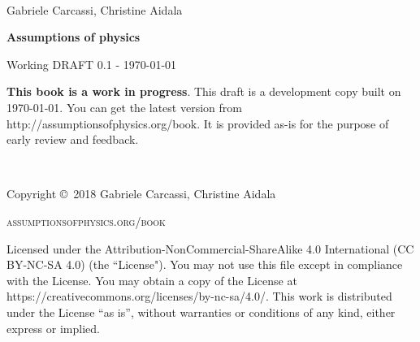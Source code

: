 \documentclass[11pt,letterpaper,fleqn]{memoir} %
\begin{document}
	




\frontmatter
\thispagestyle{empty}

~

\vspace{20pt}

{\large \noindent Gabriele Carcassi, Christine Aidala }

\vspace{60pt}

{\Huge \noindent \textbf{Assumptions of physics}}

\vspace{30pt}

{\large \noindent Working DRAFT 0.1 - \today}

\vfill


\noindent \textbf{This book is a work in progress}. This draft is a development copy built on \today. You can get the latest version from http://assumptionsofphysics.org/book. It is provided as-is for the purpose of early review and feedback. 

\newpage
~\vfill
\thispagestyle{empty}

\noindent Copyright \copyright\ 2018 Gabriele Carcassi, Christine Aidala

\vspace{12pt}

\noindent \textsc{assumptionsofphysics.org/book}

\vspace{12pt}

\noindent Licensed under the Attribution-NonCommercial-ShareAlike 4.0 International (CC BY-NC-SA 4.0) (the ``License"). You may not use this file except in compliance with the License. You may obtain a copy of the License at https://creativecommons.org/licenses/by-nc-sa/4.0/. This work is distributed under the License ``as is'', without warranties or conditions of any kind, either express or implied.
\end{document}
